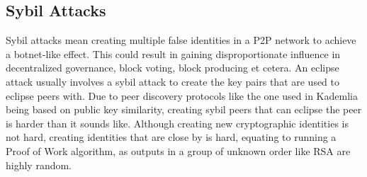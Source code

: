 \subsection{Sybil Attacks}
Sybil attacks mean creating multiple false identities in a P2P network to achieve a botnet-like effect. This could result in gaining disproportionate influence in decentralized governance, block voting, block producing et cetera. An eclipse attack usually involves a sybil attack to create the key pairs that are used to eclipse peers with. Due to peer discovery protocols like the one used in Kademlia being based on public key similarity, creating sybil peers that can eclipse the peer is harder than it sounds like. Although creating new cryptographic identities is not hard, creating identities that are close by is hard, equating to running a Proof of Work algorithm, as outputs in a group of unknown order like RSA are highly random.~\cite{Urdaneta2011-oi, Cholez2009-po}
